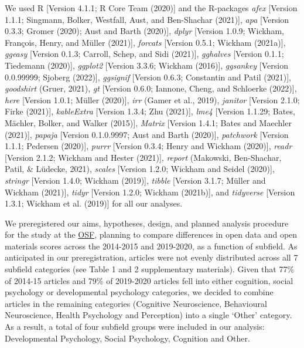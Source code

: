 \documentclass[
  english,
  man,floatsintext]{apa6}
\begin{document}
We used R {[}Version 4.1.1; R Core Team (2020){]} and the R-packages \emph{afex} {[}Version 1.1.1; Singmann, Bolker, Westfall, Aust, and Ben-Shachar (2021){]}, \emph{apa} {[}Version 0.3.3; Gromer (2020); Aust and Barth (2020){]}, \emph{dplyr} {[}Version 1.0.9; Wickham, François, Henry, and Müller (2021){]}, \emph{forcats} {[}Version 0.5.1; Wickham (2021a){]}, \emph{ggeasy} {[}Version 0.1.3; Carroll, Schep, and Sidi (2021){]}, \emph{gghalves} {[}Version 0.1.1; Tiedemann (2020){]}, \emph{ggplot2} {[}Version 3.3.6; Wickham (2016){]}, \emph{ggsankey} {[}Version 0.0.99999; Sjoberg (2022){]}, \emph{ggsignif} {[}Version 0.6.3; Constantin and Patil (2021){]}, \emph{goodshirt} (Gruer, 2021), \emph{gt} {[}Version 0.6.0; Iannone, Cheng, and Schloerke (2022){]}, \emph{here} {[}Version 1.0.1; Müller (2020){]}, \emph{irr} (Gamer et al., 2019), \emph{janitor} {[}Version 2.1.0; Firke (2021){]}, \emph{kableExtra} {[}Version 1.3.4; Zhu (2021){]}, \emph{lme4} {[}Version 1.1.29; Bates, Mächler, Bolker, and Walker (2015){]}, \emph{Matrix} {[}Version 1.4.1; Bates and Maechler (2021){]}, \emph{papaja} {[}Version 0.1.0.9997; Aust and Barth (2020){]}, \emph{patchwork} {[}Version 1.1.1; Pedersen (2020){]}, \emph{purrr} {[}Version 0.3.4; Henry and Wickham (2020){]}, \emph{readr} {[}Version 2.1.2; Wickham and Hester (2021){]}, \emph{report} (Makowski, Ben-Shachar, Patil, \& Lüdecke, 2021), \emph{scales} {[}Version 1.2.0; Wickham and Seidel (2020){]}, \emph{stringr} {[}Version 1.4.0; Wickham (2019){]}, \emph{tibble} {[}Version 3.1.7; Müller and Wickham (2021){]}, \emph{tidyr} {[}Version 1.2.0; Wickham (2021b){]}, and \emph{tidyverse} {[}Version 1.3.1; Wickham et al. (2019){]} for all our analyses.

We preregistered our aims, hypotheses, design, and planned analysis procedure for the study at the \href{https://osf.io/gqv9n/?view_only=b97cd4c4f6d645bc9e8870d97b6f3da4}{OSF}, planning to compare differences in open data and open materials scores across the 2014-2015 and 2019-2020, as a function of subfield.
As anticipated in our preregistration, articles were not evenly distributed across all 7 subfield categories (see Table 1 and 2 supplementary materials). Given that 77\% of 2014-15 articles and 79\% of 2019-2020 articles fell into either cognition, social psychology or developmental psychology categories, we decided to combine articles in the remaining categories (Cognitive Neuroscience, Behavioural Neuroscience, Health Psychology and Perception) into a single `Other' category. As a result, a total of four subfield groups were included in our analysis: Developmental Psychology, Social Psychology, Cognition and Other.
\end{document}
